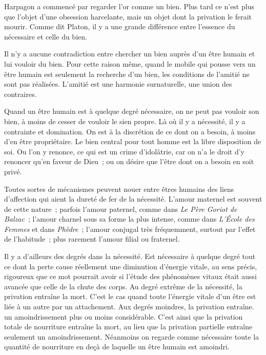 \documentclass[french,twoside]{book} %
\begin{document}
Harpagon a commencé par regarder l'or comme un bien. Plus tard ce n'est plus que l'objet d'une obsession harcelante, mais un objet dont la privation le ferait mourir. Comme dit Platon, il y a une grande différence entre l'essence du nécessaire et celle du bien.\par
Il n'y a aucune contradiction entre chercher un bien auprès d'un être humain et lui vouloir du bien. Pour cette raison même, quand le mobile qui pousse vers un être humain est seulement la recherche d'un bien, les conditions de l'amitié ne sont pas réalisées. L'amitié est une harmonie surnaturelle, une union des contraires.\par
Quand un être humain est à quelque degré nécessaire, on ne peut pas vouloir son bien, à moins de cesser de vouloir le sien propre. Là où il y a nécessité, il y a contrainte et domination. On est à la discrétion de ce dont on a besoin, à moins d'en être propriétaire. Le bien central pour tout homme est la libre disposition de soi. Ou l'on y renonce, ce qui est un crime d'idolâtrie, car on n'a le droit d'y renoncer qu'en faveur de Dieu ; ou on désire que l'être dont on a besoin en soit privé.\par
Toutes sortes de mécanismes peuvent nouer entre êtres humains des liens d'affection qui aient la dureté de fer de la nécessité. L'amour maternel est souvent de cette nature ; parfois l'amour paternel, comme dans {\itshape Le Père Goriot de Balzac} ; l'amour charnel sous sa forme la plus intense, comme dans {\itshape L'École des Femmes} et dans {\itshape Phèdre} ; l'amour conjugal très fréquemment, surtout par l'effet de l'habitude ; plus rarement l'amour filial ou fraternel.\par
Il y a d'ailleurs des degrés dans la nécessité. Est nécessaire à quelque degré tout ce dont la perte cause réellement une diminution d'énergie vitale, au sens précis, rigoureux que ce mot pourrait avoir si l'étude des phénomènes vitaux était aussi avancée que celle de la chute des corps. Au degré extrême de la nécessité, la privation entraîne la mort. C'est le cas quand toute l'énergie vitale d'un être est liée à un autre par un attachement. Aux degrés moindres, la privation entraîne. un amoindrissement plus ou moins considérable. C'est ainsi que la privation totale de nourriture entraîne la mort, au lieu que la privation partielle entraîne seulement un amoindrissement. Néanmoins on regarde comme nécessaire toute la quantité de nourriture en deçà de laquelle un être humain est amoindri.\par
\end{document}
